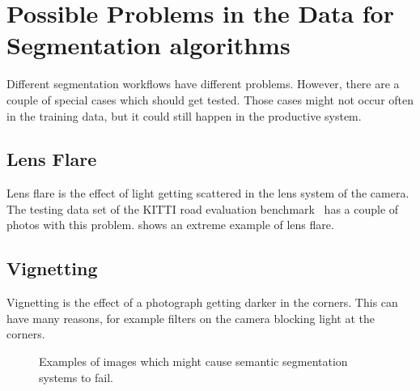 
\section{Possible Problems in the Data for Segmentation algorithms}%
\label{sec:problems}

Different segmentation workflows have different problems. However, there are
a couple of special cases which should get tested. Those cases might not occur
often in the training data, but it could still happen in the productive system.

\subsection{Lens Flare}
Lens flare is the effect of light getting scattered in the lens system of the
camera. The testing data set of the KITTI road evaluation
benchmark~\cite{Fritsch2013ITSC} has a couple of photos with this problem.
 shows an extreme example of lens flare.


\subsection{Vignetting}
Vignetting is the effect of a photograph getting darker in the corners. This
can have many reasons, for example filters on the camera blocking light at the
corners.


\begin{figure}
\centering
{}%
%
%
\caption{Examples of images which might cause semantic segmentation systems to fail.}
\label{fig:test}
\end{figure}


